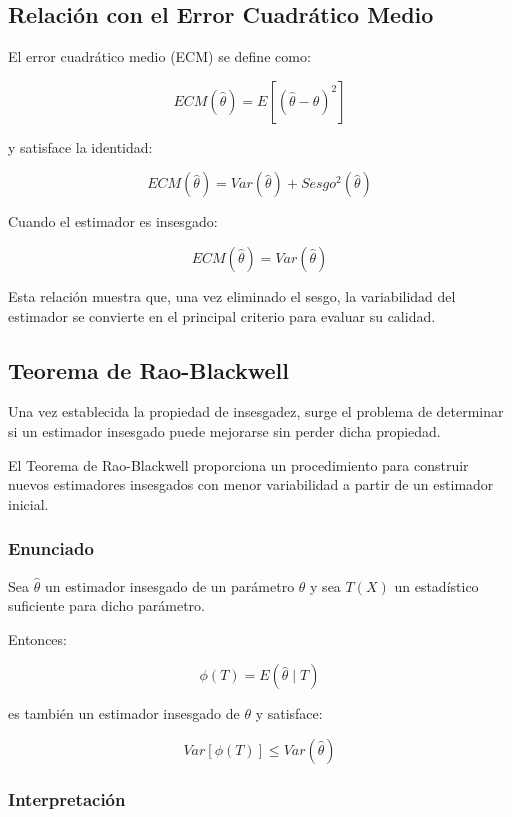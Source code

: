 \documentclass[
  11pt,
]{report}
\begin{document}
\subsection{Relación con el Error Cuadrático
Medio}\label{relaciuxf3n-con-el-error-cuadruxe1tico-medio}

El error cuadrático medio (ECM) se define como:

\[ECM(\hat{\theta})
=
E[(\hat{\theta}-\theta)^2]\]

y satisface la identidad:

\[ECM(\hat{\theta})
=
Var(\hat{\theta})
+
Sesgo^2(\hat{\theta})\]

Cuando el estimador es insesgado:

\[ECM(\hat{\theta})
=
Var(\hat{\theta})\]

Esta relación muestra que, una vez eliminado el sesgo, la variabilidad
del estimador se convierte en el principal criterio para evaluar su
calidad.

\subsection{Teorema de Rao-Blackwell}\label{teorema-de-rao-blackwell}

Una vez establecida la propiedad de insesgadez, surge el problema de
determinar si un estimador insesgado puede mejorarse sin perder dicha
propiedad.

El Teorema de Rao-Blackwell proporciona un procedimiento para construir
nuevos estimadores insesgados con menor variabilidad a partir de un
estimador inicial.

\subsubsection{Enunciado}\label{enunciado}

Sea \(\hat{\theta}\) un estimador insesgado de un parámetro \(\theta\) y
sea \(T(X)\) un estadístico suficiente para dicho parámetro.

Entonces:

\[\phi(T)
=
E(\hat{\theta}\mid T)\]

es también un estimador insesgado de \(\theta\) y satisface:

\[Var[\phi(T)]
\le
Var(\hat{\theta})\]

\subsubsection{Interpretación}\label{interpretaciuxf3n-1}
\end{document}
